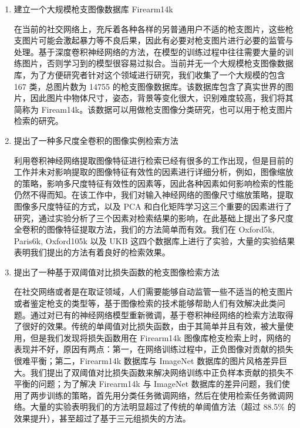 \begin{enumerate}
\item 建立一个大规模枪支图像数据库 Firearm14k

在当前的社交网络上，充斥着各种各样的另普通用户不适的枪支图片，这些枪支图片可能会激起暴力等不良后果，因此有必要对枪支图片进行必要的监管与处理。基于深度卷积神经网络的方法，在模型的训练过程中往往需要大量的训练图片，否则学习到的模型很容易过拟合。当前并无一个大规模枪支图像数据库，为了方便研究者针对这个领域进行研究，我们收集了一个大规模的包含 167 类，总图片数为 14755 的枪支图像数据库。该数据库包含了真实世界的图片，因此图片中物体尺寸，姿态，背景等变化很大，识别难度较高，我们将其简称为 Fiream14k。该数据可以用做枪支图像分类研究，也可以用于枪支图片检索的研究。

\item 提出了一种多尺度全卷积的图像实例检索方法

利用卷积神经网络提取图像特征进行检索已经有很多的工作出现，但是目前的工作并未对影响提取的图像特征有效性的因素进行详细分析，例如，图像缩放的策略，影响多尺度特征有效性的因素等，因此各种因素如何影响检索的性能仍然不得而知。在该工作中，我们对输入神经网络的图像尺寸缩放策略，提取图像多尺度特征的方式，以及 PCA 和白化矩阵学习这三个重要的因素进行了研究，通过实验分析了三个因素对检索结果的影响，在此基础上提出了多尺度全卷积的图像特征提取方法，我们的方法简单而有效。我们在 Oxford5k, Paris6k, Oxford105k 以及 UKB 这四个数据库上进行了实验，大量的实验结果表明我们提出的方法有着良好的检索效果。

\item 提出了一种基于双阈值对比损失函数的枪支图像检索方法

在社交网络或者是在取证领域，人们需要能够自动监管一些不适当的枪支图片或者鉴定枪支的类型等，基于图像检索的技术能够帮助人们有效解决此类问题。通过对已有的神经网络模型重新微调，基于卷积神经网络的检索方法取得了很好的效果。传统的单阈值对比损失函数，由于其简单并且有效，被大量使用，但是我们发现将损失函数用在 Firearm14k 图像库枪支检索上时，网络的表现并不好，原因有两点：第一，在网络训练过程中，正负图像对贡献的损失很难平衡；第二，Firearm14k 数据库与 ImageNet 数据库的图片风格差异巨大。我们提出了双阈值对比损失函数来解决网络训练中正负样本贡献的损失不平衡的问题；为了解决 Firearm14k 与 ImageNet 数据库的差异问题，我们使用了两步训练的策略，首先用分类任务微调网络，然后在使用检索任务微调网络。大量的实验表明我们的方法明显超过了传统的单阈值方法（超过 88.5\% 的效果提升），甚至超过了基于三元组损失的方法。

\end{enumerate}


